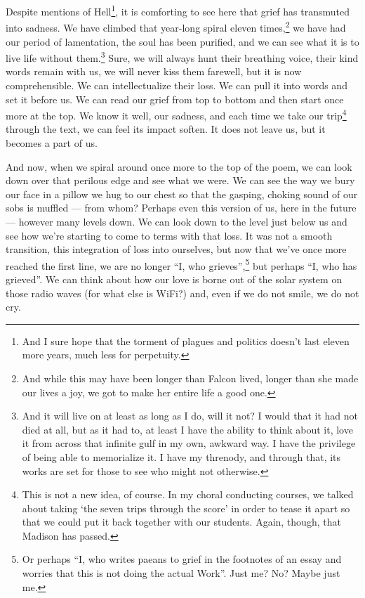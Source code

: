 \documentclass[12pt,oneside]{memoir}
\begin{document}
Despite mentions of Hell\footnote{And I sure hope that the torment of plagues and politics doesn't last eleven more years, much less for perpetuity.}, it is comforting to see here that grief has transmuted into sadness. We have climbed that year-long spiral eleven times,\footnote{And while this may have been longer than Falcon lived, longer than she made our lives a joy, we got to make her entire life a good one.} we have had our period of lamentation, the soul has been purified, and we can see what it is to live life without them.\footnote{And it will live on at least as long as I do, will it not? I would that it had not died at all, but as it had to, at least I have the ability to think about it, love it from across that infinite gulf in my own, awkward way. I have the privilege of being able to memorialize it. I have my threnody, and through that, its works are set for those to see who might not otherwise.} Sure, we will always hunt their breathing voice, their kind words remain with us, we will never kiss them farewell, but it is now comprehensible. We can intellectualize their loss. We can pull it into words and set it before us. We can read our grief from top to bottom and then start once more at the top. We know it well, our sadness, and each time we take our trip\footnote{This is not a new idea, of course. In my choral conducting courses, we talked about taking `the seven trips through the score' in order to tease it apart so that we could put it back together with our students. Again, though, that Madison has passed.} through the text, we can feel its impact soften. It does not leave us, but it becomes  a part of us.

And now, when we spiral around once more to the top of the poem, we can look down over that perilous edge and see what we were. We can see the way we bury our face in a pillow we hug to our chest so that the gasping, choking sound of our sobs is muffled --- from whom? Perhaps even this version of us, here in the future --- however many levels down. We can look down to the level just below us and see how we're starting to come to terms with that loss. It was not a smooth transition, this integration of loss into ourselves, but now that we've once more reached the first line, we are no longer ``I, who grieves'',\footnote{Or perhaps ``I, who writes paeans to grief in the footnotes of an essay and worries that this is not doing the actual Work''. Just me? No? Maybe just me.} but perhaps ``I, who has grieved''. We can think about how our love is borne out of the solar system on those radio waves (for what else is WiFi?) and, even if we do not smile, we do not cry.
\end{document}
